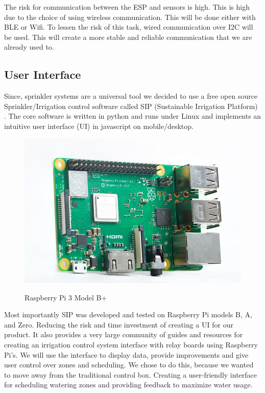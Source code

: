 \documentclass[letterpaper, 10 pt, conference]{ieeeconf}  %
\begin{document}
The risk for communication between the ESP and sensors is high. This is high due to the choice of using wireless communication. This will be done either with BLE or Wifi. To lessen the risk of this task, wired communication over I2C will be used. This will create a more stable and reliable communication that we are already used to. 

\subsection{User Interface}
Since, sprinkler systems are a universal tool we decided to use a free open source Sprinkler/Irrigation control software called SIP (Sustainable Irrigation Platform) \cite{SIP}. The core software is written in python and runs under Linux and implements an intuitive user interface (UI) in javascript on mobile/desktop. 

\begin{figure}
    \centering
    \includegraphics[scale=.3]{RaspberryPIB.jpg}
    \caption{Raspberry Pi 3 Model B+}
    \label{fig:pi_label}   \cite{RaspberryPiB}
\end{figure}

Most importantly SIP was developed and tested on Raspberry Pi models B, A, and Zero. Reducing the risk and time investment of creating a UI for our product. It also provides a very large community of guides and resources for creating an irrigation control system interface with relay boards using Raspberry Pi's. We will use the interface to display data, provide improvements and give user control over zones and scheduling. We chose to do this, because we wanted to move away from the traditional control box. Creating a user-friendly interface for scheduling watering zones and providing feedback to maximize water usage.
\end{document}
